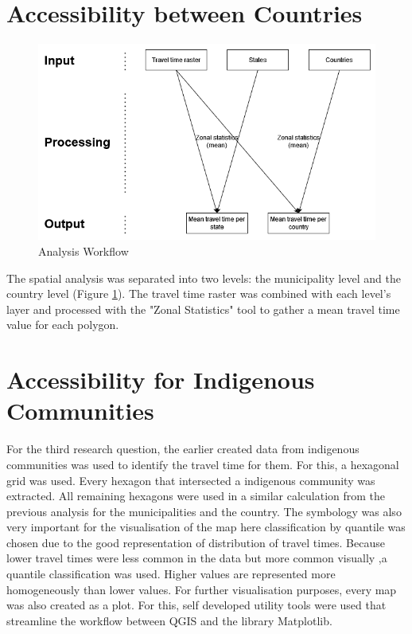 \documentclass[11pt, a4paper]{report}
\begin{document}
\section{Accessibility between Countries}\label{sec:method:spatialanalysis}

\begin{figure}[H]
  \centering
  \includegraphics[width=0.9\linewidth]{figures/analysisworkflow.png}
  \caption{Analysis Workflow}
  \label{fig:analysisworkflow}
\end{figure}

The spatial analysis was separated into two levels: the municipality level and the country level (Figure \ref{fig:analysisworkflow}). The travel time raster was combined with each level's layer and processed with the "Zonal Statistics" tool to gather a mean travel time value for each polygon.

\section{Accessibility for Indigenous Communities}\label{sec:method:indigenous}

For the third research question, the earlier created data from indigenous communities was used to identify the travel time for them. For this, a hexagonal grid was used. Every hexagon that intersected a indigenous community was extracted. All remaining hexagons were used in a similar calculation from the previous analysis for the municipalities and the country. The symbology was also very important for the visualisation of the map here classification by quantile was chosen due to the good representation of distribution of travel times. Because lower travel times were less common in the data but more common visually ,a quantile classification was used. Higher values are represented more homogeneously than lower values. For further visualisation purposes, every map was also created as a plot. For this, self developed utility tools were used that streamline the workflow between QGIS and the library Matplotlib. 
\end{document}
